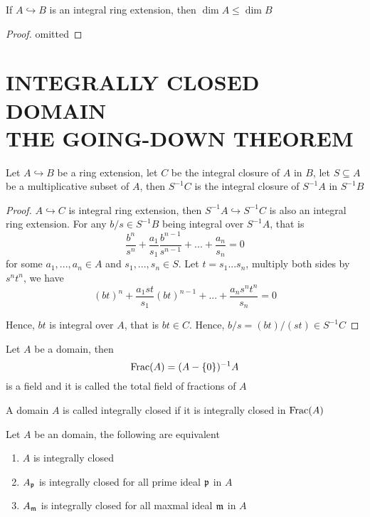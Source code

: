 \begin{corollary}
	If $A \hookrightarrow B$ is an integral ring extension, then $\dim A \leq \dim B$
\end{corollary}

\begin{proof}
	omitted
\end{proof}

\section{INTEGRALLY CLOSED DOMAIN \\ THE GOING-DOWN THEOREM}

\begin{proposition}
	Let $A \hookrightarrow B$ be a ring extension, let $C$ be the integral closure of $A$ in $B$, let $S \subseteq A$ be a multiplicative subset of $A$, then $S^{-1} C$ is the integral closure of $S^{-1} A$ in $S^{-1} B$
\end{proposition}

\begin{proof}
	$A \hookrightarrow C$ is integral ring extension, then $S^{-1} A \hookrightarrow S^{-1} C$ is also an integral ring extension. For any $b / s \in S^{-1} B$ being integral over $S^{-1} A$, that is
	$$
		\frac{b^n}{s^n} + \frac{a_1}{s_1} \frac{b^{n-1}}{s^{n-1}} + ... + \frac{a_n}{s_n} = 0
	$$
	for some $a_1, ..., a_n \in A$ and $s_1, ..., s_n \in S$. Let $t = s_1 ... s_n$, multiply both sides by $s^n t^n$, we have
	$$
		(bt)^n + \frac{a_1 s t}{s_1} (bt)^{n-1} + ... + \frac{a_n s^n t^n}{s_n} = 0
	$$
	
	Hence, $bt$ is integral over $A$, that is $bt \in C$. Hence, $b / s = (bt) / (st) \in S^{-1} C$
\end{proof}

\begin{definition}
	Let $A$ be a domain, then
	$$
		\operatorname{Frac}(A) = (A - \{0\})^{-1} A
	$$
	is a field and it is called the total field of fractions of $A$
\end{definition}

\begin{definition}
	A domain $A$ is called integrally closed if it is integrally closed in $\operatorname{Frac}(A)$
\end{definition}

\begin{theorem}
	Let $A$ be an domain, the following are equivalent
	\begin{enumerate}
		\item $A$ is integrally closed
		\item $A_{\mathfrak{p}}$ is integrally closed for all prime ideal $\mathfrak{p}$ in $A$
		\item $A_{\mathfrak{m}}$ is integrally closed for all maxmal ideal $\mathfrak{m}$ in $A$
	\end{enumerate}
\end{theorem}

